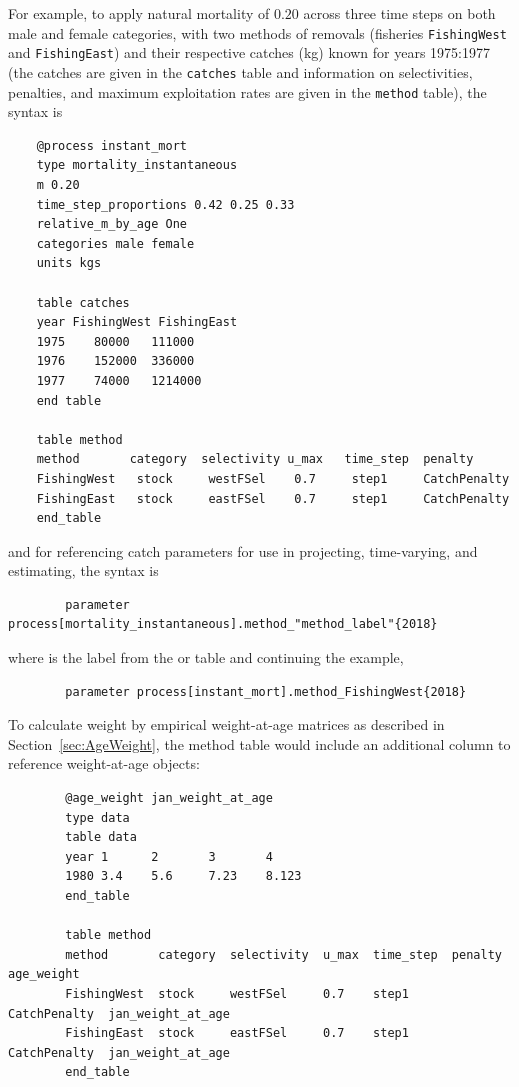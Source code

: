 For example, to apply natural mortality of $0.20$ across three time steps on both male and female categories, with two methods of removals (fisheries \texttt{FishingWest} and \texttt{FishingEast}) and their respective catches (kg) known for years 1975:1977 (the catches are given in the \texttt{catches} table and information on selectivities, penalties, and maximum exploitation rates are given in the \texttt{method} table), the syntax is


{\small{\begin{verbatim}
	@process instant_mort
	type mortality_instantaneous
	m 0.20
	time_step_proportions 0.42 0.25 0.33
	relative_m_by_age One
	categories male female
	units kgs

	table catches
	year FishingWest FishingEast
	1975	80000	111000
	1976	152000	336000
	1977	74000	1214000
	end table

	table method
	method       category  selectivity u_max   time_step  penalty
	FishingWest   stock     westFSel    0.7     step1     CatchPenalty
	FishingEast   stock     eastFSel    0.7     step1     CatchPenalty
	end_table
	\end{verbatim}}}

and for referencing catch parameters for use in projecting, time-varying, and estimating, the syntax is

{\small{\begin{verbatim}
		parameter process[mortality_instantaneous].method_"method_label"{2018}
\end{verbatim}}}

where  is the label from the  or  table and continuing the example,

{\small{\begin{verbatim}
		parameter process[instant_mort].method_FishingWest{2018}
\end{verbatim}}}

To calculate weight by empirical weight-at-age matrices as described in Section~\ref{sec:AgeWeight}, the method table would include an additional column to reference weight-at-age objects:

{\small{\begin{verbatim}
		@age_weight jan_weight_at_age
		type data
		table data
		year 1 		2 		3 		4
		1980 3.4	5.6		7.23 	8.123
		end_table

		table method
		method       category  selectivity  u_max  time_step  penalty       age_weight
		FishingWest  stock     westFSel     0.7    step1      CatchPenalty  jan_weight_at_age
		FishingEast  stock     eastFSel     0.7    step1      CatchPenalty  jan_weight_at_age
		end_table
\end{verbatim}}}


